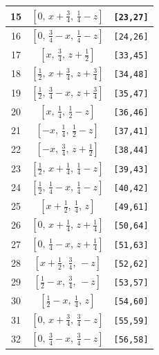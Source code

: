 \documentclass[fleqn,8pt]{jsarticle}
\begin{document}
\begin{longtable}{ccc}
15 & $\left[ 0,\, x + \frac{3}{4},\, \frac{1}{4} - z \right]$ & {\tt [23,27]} \\ \hline
16 & $\left[ 0,\, \frac{3}{4} - x,\, \frac{1}{4} - z \right]$ & {\tt [24,26]} \\ \hline
17 & $\left[ x,\, \frac{3}{4},\, z + \frac{1}{2} \right]$ & {\tt [33,45]} \\ \hline
18 & $\left[ \frac{1}{2},\, x + \frac{3}{4},\, z + \frac{3}{4} \right]$ & {\tt [34,48]} \\ \hline
19 & $\left[ \frac{1}{2},\, \frac{3}{4} - x,\, z + \frac{3}{4} \right]$ & {\tt [35,47]} \\ \hline
20 & $\left[ x,\, \frac{1}{4},\, \frac{1}{2} - z \right]$ & {\tt [36,46]} \\ \hline
21 & $\left[ - x,\, \frac{1}{4},\, \frac{1}{2} - z \right]$ & {\tt [37,41]} \\ \hline
22 & $\left[ - x,\, \frac{3}{4},\, z + \frac{1}{2} \right]$ & {\tt [38,44]} \\ \hline
23 & $\left[ \frac{1}{2},\, x + \frac{1}{4},\, \frac{1}{4} - z \right]$ & {\tt [39,43]} \\ \hline
24 & $\left[ \frac{1}{2},\, \frac{1}{4} - x,\, \frac{1}{4} - z \right]$ & {\tt [40,42]} \\ \hline
25 & $\left[ x + \frac{1}{2},\, \frac{1}{4},\, z \right]$ & {\tt [49,61]} \\ \hline
26 & $\left[ 0,\, x + \frac{1}{4},\, z + \frac{1}{4} \right]$ & {\tt [50,64]} \\ \hline
27 & $\left[ 0,\, \frac{1}{4} - x,\, z + \frac{1}{4} \right]$ & {\tt [51,63]} \\ \hline
28 & $\left[ x + \frac{1}{2},\, \frac{3}{4},\, - z \right]$ & {\tt [52,62]} \\ \hline
29 & $\left[ \frac{1}{2} - x,\, \frac{3}{4},\, - z \right]$ & {\tt [53,57]} \\ \hline
30 & $\left[ \frac{1}{2} - x,\, \frac{1}{4},\, z \right]$ & {\tt [54,60]} \\ \hline
31 & $\left[ 0,\, x + \frac{3}{4},\, \frac{3}{4} - z \right]$ & {\tt [55,59]} \\ \hline
32 & $\left[ 0,\, \frac{3}{4} - x,\, \frac{3}{4} - z \right]$ & {\tt [56,58]} \\
\end{longtable}
\renewcommand{\arraystretch}{1.2}
\end{document}
